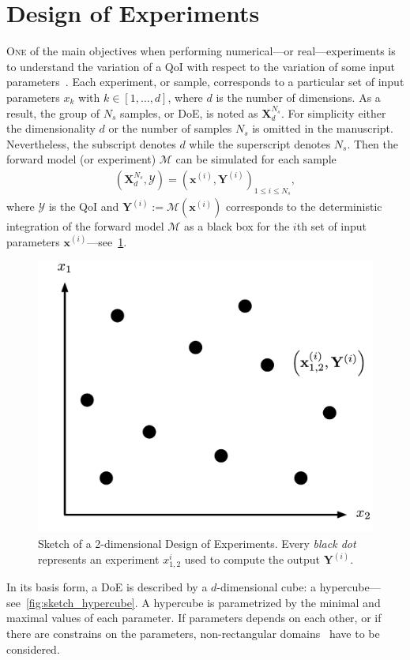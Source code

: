 \section{Design of Experiments}\label{sec:doe}

\lettrine{O}{ne} of the main objectives when performing numerical---or real---experiments is to understand the variation of a QoI with respect to the variation of some input parameters~\citep{Sacks1989}. Each experiment, or sample, corresponds to a particular set of input parameters $x_k$ with $k \in [1, \dots , d]$, where $d$ is the number of dimensions. As a result, the group of $N_s$ samples, or DoE, is noted as $\mathbf{X}^{N_s}_d$. For simplicity either the dimensionality $d$ or the number of samples $N_s$ is omitted in the manuscript. Nevertheless, the subscript denotes $d$ while the superscript denotes $N_s$. Then the forward model (or experiment) $\mathcal{M}$ can be simulated for each sample
\begin{align}
(\mathbf{X}^{N_s}_d, \mathcal{Y})=\left(\mathbf{x}^{(i)},\mathbf{Y}^{(i)}\right)_{1\leq i\leq N_{s}},
\end{align}
\noindent where $\mathcal{Y}$ is the QoI and $\mathbf{Y}^{(i)} := \mathcal{M}(\mathbf{x}^{(i)})$ corresponds to the deterministic integration of the forward model $\mathcal{M}$ as a black box for the $i$th set of input parameters $\mathbf{x}^{(i)}$---see~\cref{fig:doe}.

\begin{figure}[!ht]
\centering
\includegraphics[width=0.5\linewidth,keepaspectratio]{fig/literature/doe.pdf}
\caption{Sketch of a 2-dimensional Design of Experiments. Every \emph{black dot} represents an experiment $x_{1, 2}^i$ used to compute the output $\mathbf{Y}^{(i)}$.}
\label{fig:doe}
\end{figure}

In its basis form, a DoE is described by a $d$-dimensional cube: a hypercube---see~\cref{fig:sketch_hypercube}. A hypercube is parametrized by the minimal and maximal values of each parameter. If parameters depends on each other, or if there are constrains on the parameters, non-rectangular domains~\citep{Lekivetz2015} have to be considered.

